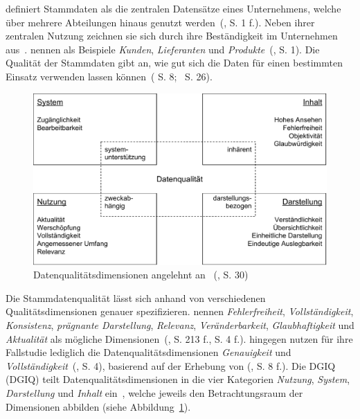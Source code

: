 \documentclass[
  language=german, %
  type=bachelor,%
  ngerman
]{isthesis}
\begin{document}
\begin{content}
	\textsc{\citeauthor{otto2012design}} definiert Stammdaten als die zentralen
	Datensätze eines Unternehmens, welche über mehrere Abteilungen hinaus genutzt
	werden~(\citeyear{otto2012design}, S.  1 f.).  Neben ihrer zentralen Nutzung
	zeichnen sie sich durch ihre Beständigkeit im Unternehmen aus~\cite[][S.
	1]{knolmayer2006quality}.  \textsc{\citeauthor{knolmayer2006quality}} nennen
	als Beispiele \textit{Kunden}, \textit{Lieferanten} und
	\textit{Produkte}~(\citeyear{knolmayer2006quality}, S. 1). Die Qualität der
	Stammdaten gibt an, wie gut sich die Daten für einen bestimmten Einsatz
	verwenden lassen können~(\citeauthor{otto2011stammdatenmanagement}
	\citeyear{otto2011stammdatenmanagement} S.
	8;~\citeauthor{hinrichs2002datenqualitatsmanagement}
	\citeyear{hinrichs2002datenqualitatsmanagement} S. 26).

  \begin{figure}
    \includegraphics[scale=0.60]{content/figures/15-dimensions}
    \caption[Datenqualitätsdimensionen]{Datenqualitätsdimensionen angelehnt an~\textsc{\citeauthor{rohweder2015informationsqualitat}} (\citeyear{rohweder2015informationsqualitat}, S. 30)}\label{15-dimensions}
  \end{figure}

	Die Stammdatenqualität lässt sich anhand von verschiedenen
	Qualitätsdimensionen genauer spezifizieren.
	\textsc{\citeauthor{pipino2002data}} nennen \zB{} \textit{Fehlerfreiheit},
	\textit{Vollständigkeit}, \textit{Konsistenz}, \textit{prägnante
	Darstellung}, \textit{Relevanz}, \textit{Veränderbarkeit},
	\textit{Glaubhaftigkeit} und \textit{Aktualität} als mögliche
	Dimensionen~(\citeyear{pipino2002data, legner2007stammdaten}, S. 213 f., S. 4
	f.). \textsc{\citeauthor{baghi2013controlling}} hingegen nutzen für ihre
	Fallstudie lediglich die Datenqualitätsdimensionen \textit{Genauigkeit} und
	\textit{Vollständigkeit}~(\citeyear{baghi2013controlling}, S. 4), basierend
	auf der Erhebung von
	\textsc{\citeauthor{wand1996anchoring}} (\citeyear{wand1996anchoring}, S. 8
	f.). Die \acrlong{DGIQ} (\acrshort{DGIQ}) teilt Datenqualitätsdimensionen in
	die vier Kategorien \textit{Nutzung}, \textit{System}, \textit{Darstellung}
	und \textit{Inhalt} ein~\cite[][S. 29 - 31]{rohweder2015informationsqualitat},
	welche jeweils den Betrachtungsraum der Dimensionen abbilden (siehe
	Abbildung~\ref{15-dimensions}).


\end{content}
\end{document}
